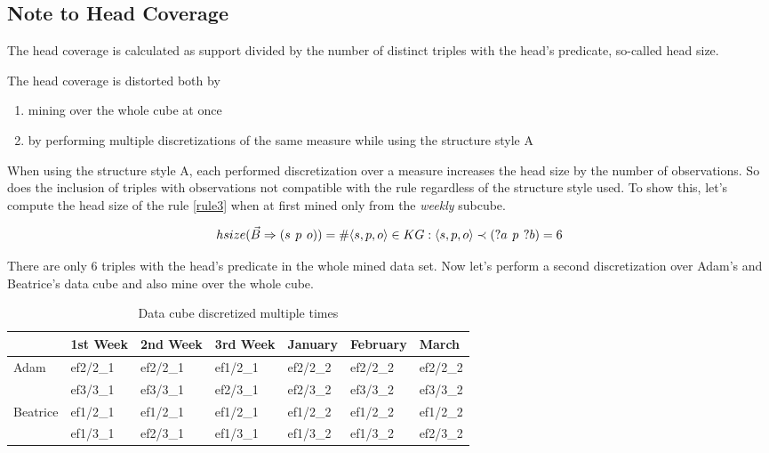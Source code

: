 \subsection{Note to Head Coverage\label{notehc}}

The head coverage is calculated as support divided by the number of distinct triples with the head's predicate, so-called head size.

The head coverage is distorted both by

\begin{enumerate}
    \item mining over the whole cube at once
    \item by performing multiple discretizations of the same measure while using the structure style A
\end{enumerate}

When using the structure style A, each performed discretization over a measure increases the head size by the number of observations. So does the inclusion of triples with observations not compatible with the rule regardless of the structure style used. To show this, let's compute the head size of the rule \ref{rule3} when at first mined only from the \textit{weekly} subcube.

$$
hsize(\vec{B} \Rightarrow (s\hspace{0.4em}p\hspace{0.4em}o)) = \# \langle s,p,o\rangle \in KG: \langle s,p,o\rangle \prec (?a\hspace{0.4em}p\hspace{0.4em}?b) = 6 
$$

There are only 6 triples with the head's predicate in the whole mined data set. Now let's perform a second discretization over Adam's and Beatrice's data cube and also mine over the whole cube.

\begin{table}[h]
\centering
\begin{tabular}{l|llllll}
                          & 1st Week & 2nd Week & 3rd Week & January  & February & March     \\ 
\hline
\multirow{2}{*}{Adam}     & ef2/2\_1 & ef2/2\_1 & ef1/2\_1 & ef2/2\_2 & ef2/2\_2 & ef2/2\_2  \\
                          & ef3/3\_1 & ef3/3\_1 & ef2/3\_1 & ef2/3\_2 & ef3/3\_2 & ef3/3\_2  \\
\multirow{2}{*}{Beatrice} & ef1/2\_1 & ef1/2\_1 & ef1/2\_1 & ef1/2\_2 & ef1/2\_2 & ef1/2\_2  \\
                          & ef1/3\_1 & ef2/3\_1 & ef1/3\_1 & ef1/3\_2 & ef1/3\_2 & ef2/3\_2 
\end{tabular}
\caption{Data cube discretized multiple times}\label{table5}
\end{table}

